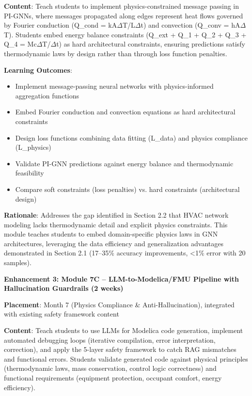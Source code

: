 \documentclass[12pt,a4paper]{article}
\begin{document}
\textbf{Content}: Teach students to implement physics-constrained message passing in PI-GNNs, where messages propagated along edges represent heat flows governed by Fourier conduction (Q\_cond = kA$\Delta$T/L$\Delta$t) and convection (Q\_conv = hA$\Delta$T). Students embed energy balance constraints (Q\_ext + Q\_1 + Q\_2 + Q\_3 + Q\_4 = Mc$\Delta$T/$\Delta$t) as hard architectural constraints, ensuring predictions satisfy thermodynamic laws by design rather than through loss function penalties.

\textbf{Learning Outcomes}:
\begin{itemize}
  \item Implement message-passing neural networks with physics-informed aggregation functions
  \item Embed Fourier conduction and convection equations as hard architectural constraints
  \item Design loss functions combining data fitting (L\_data) and physics compliance (L\_physics)
  \item Validate PI-GNN predictions against energy balance and thermodynamic feasibility
  \item Compare soft constraints (loss penalties) vs. hard constraints (architectural design)
\end{itemize}

\textbf{Rationale}: Addresses the gap identified in Section 2.2 that HVAC network modeling lacks thermodynamic detail and explicit physics constraints. This module teaches students to embed domain-specific physics laws in GNN architectures, leveraging the data efficiency and generalization advantages demonstrated in Section 2.1 (17--35\% accuracy improvements, <1\% error with 20 samples).

\textbf{Enhancement 3: Module 7C -- LLM-to-Modelica/FMU Pipeline with Hallucination Guardrails (2 weeks)}

\textbf{Placement}: Month 7 (Physics Compliance \& Anti-Hallucination), integrated with existing safety framework content

\textbf{Content}: Teach students to use LLMs for Modelica code generation, implement automated debugging loops (iterative compilation, error interpretation, correction), and apply the 5-layer safety framework to catch RAG mismatches and functional errors. Students validate generated code against physical principles (thermodynamic laws, mass conservation, control logic correctness) and functional requirements (equipment protection, occupant comfort, energy efficiency).
\end{document}
